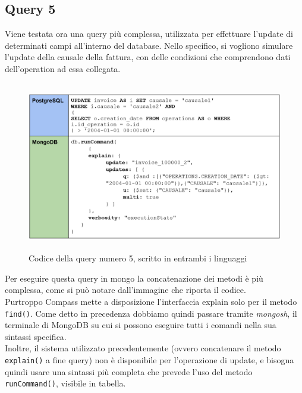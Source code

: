 
\subsection{Query 5}
Viene testata ora una query più complessa, utilizzata per effettuare l'update di determinati campi all'interno del database. Nello specifico, si vogliono simulare l'update della causale della fattura, con delle condizioni che comprendono dati dell'operation ad essa collegata.\\

\begin{figure}[htbp]
\begin{center}
\includegraphics[height=20em]{immagini/query/query5.png}
\caption{Codice della query numero 5, scritto in entrambi i linguaggi}
\end{center}
\end{figure}

\noindent Per eseguire questa query in mongo la concatenazione dei metodi è più complessa, come si può notare dall'immagine che riporta il codice.\\
Purtroppo Compass mette a disposizione l'interfaccia explain solo per il metodo \texttt{find()}. Come detto in precedenza dobbiamo quindi passare tramite \textit{mongosh}, il terminale di MongoDB su cui si possono eseguire tutti i comandi nella sua sintassi specifica.\\
Inoltre, il sistema utilizzato precedentemente (ovvero concatenare il metodo \texttt{explain()} a fine query) non è disponibile per l'operazione di update, e bisogna quindi usare una sintassi più completa che prevede l'uso del metodo \texttt{runCommand()}, visibile in tabella.\\

